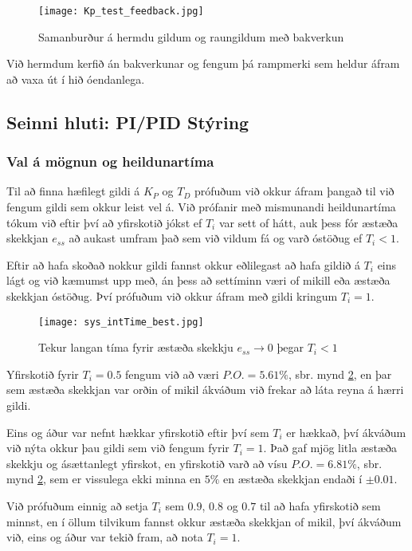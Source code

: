 \documentclass[12pt,final]{rureport}
\begin{document}
	\begin{figure}[]
		\centering
		\texttt{[image: Kp\_test\_feedback.jpg]}
		\caption{Samanburður á hermdu gildum og raungildum með bakverkun}
		\label{fig:feedback}
	\end{figure}
	
	Við hermdum kerfið án bakverkunar og fengum þá rampmerki sem heldur áfram að vaxa út í hið óendanlega.
	
	\subsection{Seinni hluti: PI/PID Stýring}
	\subsubsection{Val á mögnun og heildunartíma}
	Til að finna hæfilegt gildi á $K_P$ og $T_D$ prófuðum við okkur áfram þangað til við fengum gildi sem okkur leist vel á.
	Við prófanir með mismunandi heildunartíma tókum við eftir því að yfirskotið jókst ef $T_i$ var sett of hátt, auk þess fór æstæða skekkjan $e_{ss}$ að aukast umfram það sem við vildum fá og varð óstöðug ef $T_i < 1$.
	
	Eftir að hafa skoðað nokkur gildi fannst okkur eðlilegast að hafa gildið á $T_i$ eins lágt og við kæmumst upp með, án þess að settíminn væri of mikill eða æstæða skekkjan óstöðug. Því prófuðum við okkur áfram með gildi kringum $T_i = 1$.
	
	\begin{figure}[h!]
		\centering
		\texttt{[image: sys\_intTime\_best.jpg]}
		\caption{Tekur langan tíma fyrir æstæða skekkju $e_{ss} \rightarrow 0$ þegar $T_i < 1$}
		\label{fig:intTime}
	\end{figure}
	
	Yfirskotið fyrir $T_i = 0.5$ fengum við að væri $P.O. = 5.61\%$, sbr. mynd \ref{fig:intTime}, en þar sem æstæða skekkjan var orðin of mikil ákváðum við frekar að láta reyna á hærri gildi. 
	
	Eins og áður var nefnt hækkar yfirskotið eftir því sem $T_i$ er hækkað, því ákváðum við nýta okkur þau gildi sem við fengum fyrir $T_i = 1$. Það gaf mjög litla æstæða skekkju og ásættanlegt yfirskot, en yfirskotið varð að vísu $P.O. = 6.81\%$, sbr. mynd \ref{fig:intTime}, sem er vissulega ekki minna en $5\%$ en æstæða skekkjan endaði í $\pm 0.01$.
	
	Við prófuðum einnig að setja $T_i$ sem $0.9$, $0.8$ og $0.7$ til að hafa yfirskotið sem minnst, en í öllum tilvikum fannst okkur æstæða skekkjan of mikil, því ákváðum við, eins og áður var tekið fram, að nota $T_i = 1$.
	
\end{document}
